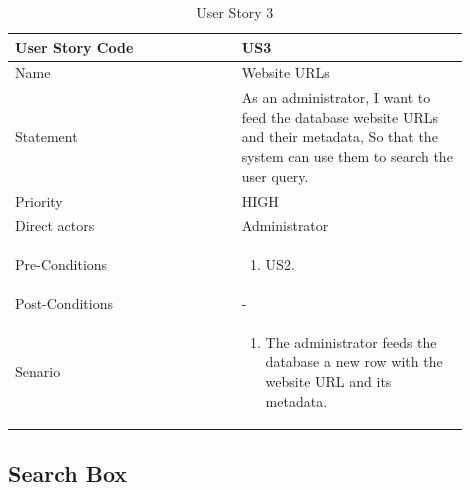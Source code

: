 \documentclass{scrartcl}
\begin{document}
\begin{table}[H]
  \caption{User Story 3}
  \begin{tabular}{p{0.45\linewidth} | p{0.45\linewidth}}
    \toprule
    User Story Code & US3 \\
    \midrule
    Name & Website URLs \\
    \hline
    Statement & As an administrator, I want to feed the database website URLs and their metadata, So that the system can use them to search the user query. \\
    \hline
    Priority & HIGH \\
    \hline
    Direct actors & Administrator \\
    \hline
    Pre-Conditions & {
                     \begin{enumerate}
                     \item US2.
                     \end{enumerate}
                     } \\
    \hline
    Post-Conditions & - \\
    \hline
    Senario & {
              \begin{enumerate}
              \item The administrator feeds the database a new row with the website URL and its metadata.
              \end{enumerate}
              } \\
    \bottomrule
  \end{tabular}
\end{table}

\subsection{Search Box}
\end{document}
